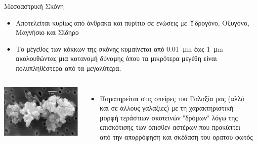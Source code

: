 \documentclass{beamer}
\begin{document}
\begin{frame}{Μεσοαστρική Σκόνη}%
		\begin{itemize}
		\item{Αποτελείται κυρίως από άνθρακα και πυρίτιο σε ενώσεις με Υδρογόνο, Οξυγόνο, Μαγνήσιο και Σίδηρο}
			\item{Tο μέγεθος των κόκκων της σκόνης κυμαίνεται από \SI{0.01}{\micro\meter} έως \SI{1}{\micro\meter} ακολουθώντας μια κατανομή δύναμης όπου τα μικρότερα μεγέθη είναι πολυπληθέστερα από τα μεγαλύτερα.}
	\end{itemize}
	\begin{columns}
		\begin{center}
			\includegraphics[width=1\linewidth]{Images/Porous_chondriteIDP}
		\end{center}
		
		\begin{itemize}
			\item{Παρατηρείται στις σπείρες του Γαλαξία μας (αλλά και σε άλλους γαλαξίες) με τη χαρακτηριστική μορφή τεράστιων σκοτεινών "δρόμων" λόγω της επισκότισης των όπισθεν αστέρων που προκύπτει από την απορρόφηση και σκέδαση του ορατού φωτός}
		\end{itemize}
	\end{columns}
\end{frame}
\end{document}
